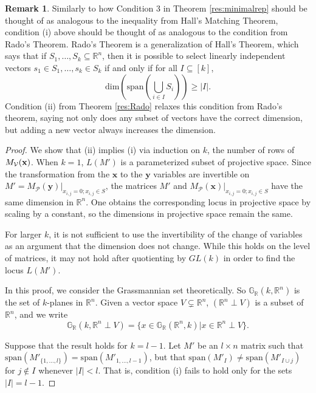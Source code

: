 \documentclass[11pt]{article}
\newcommand{\sanote}{\todo[color=violet!30]}
\newcommand{\R}{\mathbb{R}}
\newcommand{\Grall}{\mathbb{G}_{\R}}
\newcommand{\cP}{\mathcal{P}}
\newcommand{\cV}{\mathcal{V}}
\theoremstyle{remark}
\theoremstyle{definition}
\newtheorem{rmk}[thm]{Remark}
\begin{document}
\begin{appendices}
\begin{rmk}
Similarly to how Condition 3 in Theorem \ref{res:minimalrep} should be thought of as analogous to the inequality from Hall's Matching Theorem, condition (i) above should be thought of as analogous to the condition from Rado's Theorem. Rado's Theorem is a generalization of Hall's Theorem, which says that if $S_1, \dots, S_k \subseteq \mathbb{R}^{n}$, then it is possible to select linearly independent vectors $s_1 \in S_1, \dots, s_k \in S_k$ if and only if for all $I \subseteq [k]$,
%
\begin{displaymath}
\mathrm{dim}\left(\mathrm{span}\left( \bigcup_{i \in I} S_i \right) \right) \geq |I|.
\end{displaymath}
%
\noindent
Condition (ii) from Theorem \ref{res:Rado} relaxes this condition from Rado's theorem, saying not only does any subset of vectors have the correct dimension, but adding a new vector always increases the dimension.
\end{rmk}

\begin{proof}
We show that (ii) implies (i) via induction on $k$, the number of rows of $M_\cV(\bf{x})$. When $k = 1$, $L(M')$ is a parameterized subset of projective space. Since the transformation from the $\mathbf{x}$ to the $\mathbf{y}$ variables are invertible on $M' = M_{\cP}(\mathbf{y})|_{x_{i,j} = 0; x_{i,j} \in S}$, the matrices $M'$ and $M_{\cP}(\mathbf{x})|_{x_{i,j} = 0; x_{i,j} \in S}$ have the same dimension in $\R^n$. One obtains the corresponding locus in projective space by scaling by a constant, so the dimensions in projective space remain the same. 

For larger $k$, it is not sufficient to use the invertibility of the change of variables as an argument that the dimension does not change. While this holds on the level of matrices, it may not hold after quotienting by $GL(k)$ in order to find the locus $L(M')$.

In this proof, we consider the Grassmannian set theoretically. So $\Grall(k, \mathbb{R}^n)$ is the set of $k$-planes in $\mathbb{R}^n$. Given a vector space $V \subsetneq \R^n$,  $(\mathbb{R}^n \perp V)$ is a subset of $\mathbb{R}^n$, and we write 
\begin{displaymath}
\Grall(k, \mathbb{R}^n \perp V) = \{x \in  \Grall(\mathbb{R}^n,k)| x \in \R^n \perp V\}.
\end{displaymath}
\noindent

Suppose that the result holds for $k = l-1$. Let $M'$ be an $l \times n$ matrix such that $\mathrm{span}(M'_{\{1,\dots,l\}}) = \mathrm{span}(M'_{1,\dots,l-1})$, but that $\mathrm{span}(M'_I) \neq \mathrm{span}(M'_{I \cup j})$ for $j \notin I$ whenever $|I| < l$. That is, condition (i) fails to hold only for the sets $|I| = l-1$. %


\end{proof}
\end{appendices}
\end{document}
